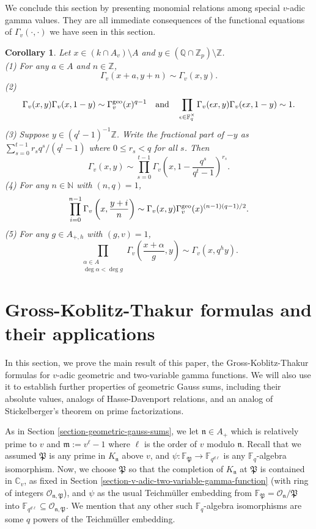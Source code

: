 \documentclass[11pt]{amsart}
\theoremstyle{plain}
\newtheorem{cor}[thm]{Corollary}
\theoremstyle{definition}
\theoremstyle{remark}
\numberwithin{equation}{section}
\newcommand{\ZZ}{\mathbb{Z}}
\newcommand{\NN}{\mathbb{N}}
\newcommand{\QQ}{\mathbb{Q}}
\newcommand{\CC}{\mathbb{C}}
\newcommand{\FF}{\mathbb{F}}
\newcommand{\mfk}{\mathfrak{m}}
\newcommand{\nfk}{\mathfrak{n}}
\newcommand{\Pfk}{\mathfrak{P}}
\newcommand{\Ocal}{\mathcal{O}}
\newcommand{\sbe}{\subseteq}
\newcommand{\Fq}{\FF_q}
\newcommand{\Fqst}{\FF_q^\times}
\newcommand{\Fqdl}{\FF_{q^{d\l}}}
\newcommand{\vgg}{\Gamma_v^{\textnormal{geo}}}
\newcommand{\vtg}{\Gamma_v}
\let\l\ell
\begin{document}
	We conclude this section by presenting monomial relations among special $v$-adic gamma values.
	They are all immediate consequences of the functional equations of $\vtg(\cdot,\cdot)$ we have seen in this section.
	
	\begin{cor}    \label{monomial-relation}
		Let $x\in (k \cap A_v) \setminus A$ and $y\in (\QQ \cap \ZZ_p) \setminus \ZZ$.  \\
		(1) For any $a\in A$ and $n \in \ZZ$,
		$$
		\vtg(x+a,y+n)
		\sim
		\vtg(x,y).
		$$
		(2)
		$$
		\vtg(x,y) \vtg(x,1-y)
		\sim \vgg(x)^{q-1}
		\quad
		\text{and}
		\quad
		\prod_{\epsilon\in \Fqst}
		\vtg(\epsilon x,y) \vtg(\epsilon x,1-y)
		\sim 1.
		$$
		(3) Suppose $y \in (q^t-1)^{-1}\ZZ$.
		Write the fractional part of $-y$ as $\sum_{s=0}^{t-1} r_sq^s/(q^t -1)$ where $0 \leq r_s < q$ for all $s$.
		Then
		$$
		\vtg(x,y)
		\sim
		\prod_{s=0}^{t-1} \vtg \left(x , 1-\frac{q^s}{q^t-1}\right)^{r_s}.
		$$
		(4) For any $n \in \NN$ with $(n,q) = 1$,
		$$
		\prod_{i=0}^{n-1} \vtg\left( x,\frac{y+i}{n} \right)
		\sim
		\vtg(x,y)\vgg(x)^{(n-1)(q-1)/2}.
		$$
		(5) For any $g \in A_{+,h}$ with $(g,v) = 1$,
		$$
		\prod_{\substack{\alpha \in A \\ \deg \alpha < \deg g}} \vtg \left(\frac{x+\alpha}{g},y\right)
		\sim
		\vtg(x,q^h y). 
		$$
	\end{cor}
	
	\section{Gross-Koblitz-Thakur formulas and their applications}
	
	In this section, we prove the main result of this paper, the Gross-Koblitz-Thakur formulas for $v$-adic geometric and two-variable gamma functions.
	We will also use it to establish further properties of geometric Gauss sums, including their absolute values, analogs of Hasse-Davenport relations, and an analog of Stickelberger's theorem on prime factorizations.
	
	As in Section \ref{section-geometric-gauss-sums}, we let $\nfk \in A_+$ which is relatively prime to $v$ and $\mfk := v^\l-1$ where $\l$ is the order of $v$ modulo $\nfk$.
	Recall that we assumed $\Pfk$ is any prime in $K_\nfk$ above $v$, and $\psi: \FF_\Pfk \to \Fqdl$ is any $\Fq$-algebra isomorphism.
	Now, we choose $\Pfk$ so that the completion of $K_\nfk$ at $\Pfk$ is contained in $\CC_v$, as fixed in Section \ref{section-v-adic-two-variable-gamma-function} (with ring of integers $\Ocal_{\nfk,\Pfk}$), and $\psi$ as the usual Teichmüller embedding from $\FF_\Pfk = \Ocal_\nfk/\Pfk$ into $\Fqdl \sbe \Ocal_{\nfk,\Pfk}$.
	We mention that any other such $\Fq$-algebra isomorphisms are some $q$ powers of the Teichmüller embedding.
	
\end{document}
